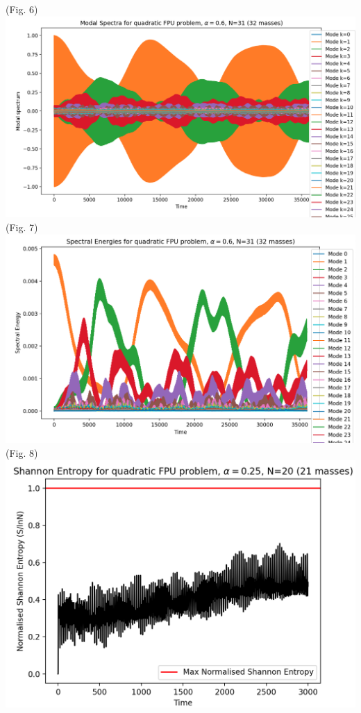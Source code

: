 \documentclass{article}
\begin{document}
\begin{center}
    (Fig. 6)\\ 
    \includegraphics[scale=.36]{modea6k1.png}\\ 
    (Fig. 7)
    \includegraphics[scale=.36]{modeE.png}\\ 
    (Fig. 8)\\
    \includegraphics[scale=.6]{SEN20t3000.png}\\ 

\end{center}
\end{document}
